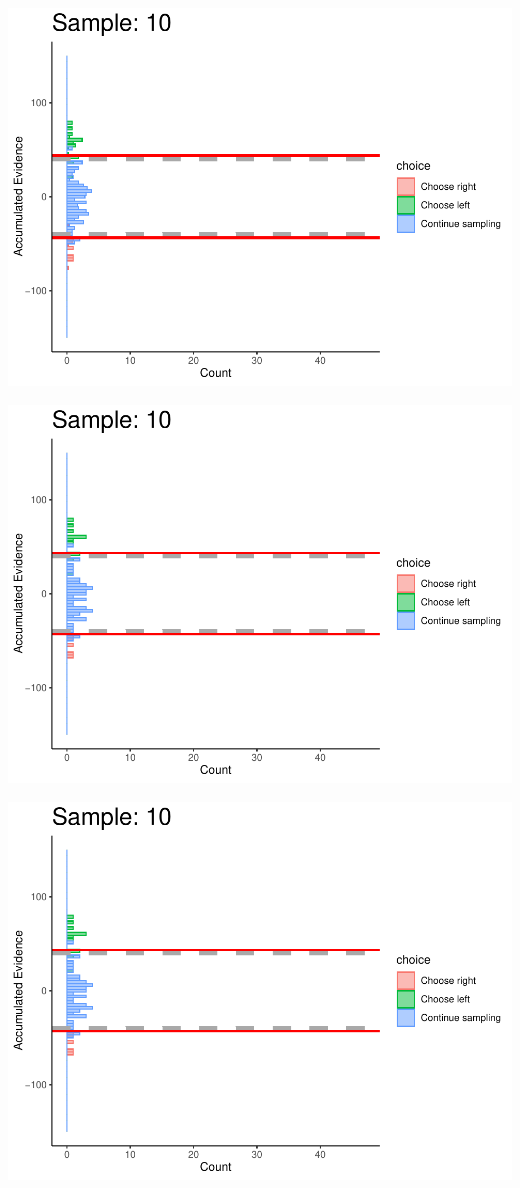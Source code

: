 \documentclass[
]{book}
\begin{document}
\begin{center}\includegraphics[width=0.8\linewidth]{LateNightBayes_files/figure-latex/collapsing_dcb-89} \end{center}

\begin{center}\includegraphics[width=0.8\linewidth]{LateNightBayes_files/figure-latex/collapsing_dcb-90} \end{center}

\begin{center}\includegraphics[width=0.8\linewidth]{LateNightBayes_files/figure-latex/collapsing_dcb-91} \end{center}
\end{document}
